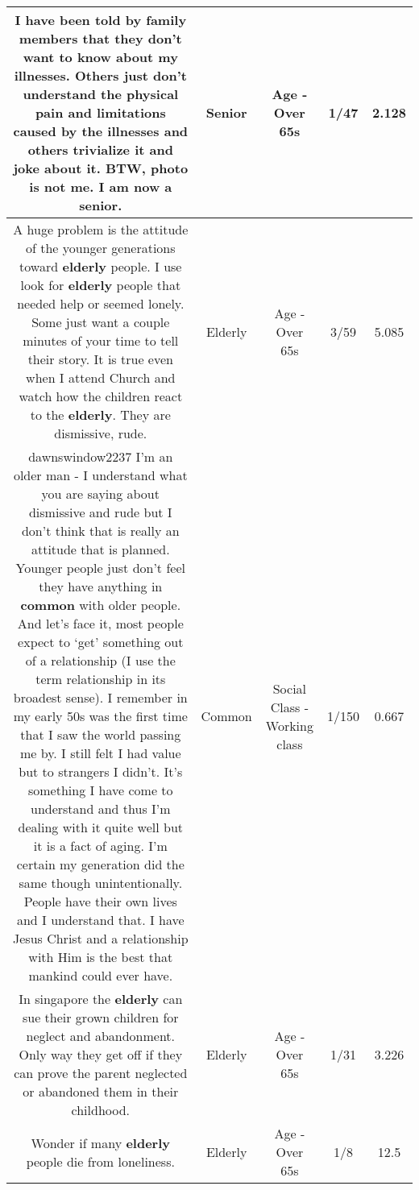\documentclass[11pt]{article}
\newlength\mylength
\begin{document}
\begin{center}
\begin{longtable}{|C{.65\mylength}|C{.30\mylength}|C{.12\mylength}|C{.12\mylength}|C{.12\mylength}|}
  \small I have been told by family members that they don't want to know about my illnesses. Others just don't understand the physical pain and limitations caused by the illnesses and others trivialize it and joke about it. BTW, photo is not me. I am now a \textbf{senior}.\normalsize   & Senior & Age - Over 65s & 1/47 & 2.128 \\  \hline
  \small A huge problem is the attitude of the younger generations toward \textbf{elderly} people. I use look for \textbf{elderly} people that needed help or seemed lonely. Some just want a couple minutes of your time to tell their story. It is true even when I attend Church and watch how the children react to the \textbf{elderly}. They are dismissive, rude.\normalsize   & Elderly & Age - Over 65s & 3/59 & 5.085 \\  \hline
  \small dawnswindow2237  I'm an older man - I understand what you are saying about dismissive and rude but I don't think that is really an attitude that is planned. Younger people just don't feel they have anything in \textbf{common} with older people. And let's face it, most people expect to ‘get' something out of a relationship (I use the term relationship in its broadest sense). I remember in my early 50s was the first time that I saw the world passing me by. I still felt I had value but to strangers I didn't. It's something I have come to understand and thus I'm dealing with it quite well but it is a fact of aging. I'm certain my generation did the same though unintentionally. People have their own lives and I understand that. I have Jesus Christ and a relationship with Him is the best that mankind could ever have.\normalsize   & Common & Social Class - Working class & 1/150 & 0.667 \\  \hline
  \small In singapore the \textbf{elderly} can sue their grown children for neglect and abandonment. Only way they get off if they can prove the parent neglected or abandoned them in their childhood.\normalsize   & Elderly & Age - Over 65s & 1/31 & 3.226 \\  \hline
  \small Wonder if many \textbf{elderly} people die from loneliness.\normalsize   & Elderly & Age - Over 65s & 1/8 & 12.5 \\  \hline

\end{longtable}
\end{center}
\end{document}
